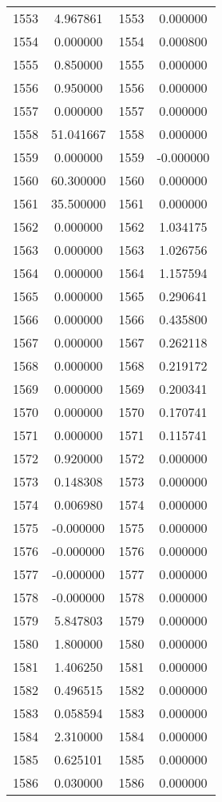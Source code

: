 \documentclass[12pt]{article}
\begin{document}
\begin{longtable}{@{}cccc@{}}
1553 & 4.967861 & 1553 & 0.000000 \\
1554 & 0.000000 & 1554 & 0.000800 \\
1555 & 0.850000 & 1555 & 0.000000 \\
1556 & 0.950000 & 1556 & 0.000000 \\
1557 & 0.000000 & 1557 & 0.000000 \\
1558 & 51.041667 & 1558 & 0.000000 \\
1559 & 0.000000 & 1559 & -0.000000 \\
1560 & 60.300000 & 1560 & 0.000000 \\
1561 & 35.500000 & 1561 & 0.000000 \\
1562 & 0.000000 & 1562 & 1.034175 \\
1563 & 0.000000 & 1563 & 1.026756 \\
1564 & 0.000000 & 1564 & 1.157594 \\
1565 & 0.000000 & 1565 & 0.290641 \\
1566 & 0.000000 & 1566 & 0.435800 \\
1567 & 0.000000 & 1567 & 0.262118 \\
1568 & 0.000000 & 1568 & 0.219172 \\
1569 & 0.000000 & 1569 & 0.200341 \\
1570 & 0.000000 & 1570 & 0.170741 \\
1571 & 0.000000 & 1571 & 0.115741 \\
1572 & 0.920000 & 1572 & 0.000000 \\
1573 & 0.148308 & 1573 & 0.000000 \\
1574 & 0.006980 & 1574 & 0.000000 \\
1575 & -0.000000 & 1575 & 0.000000 \\
1576 & -0.000000 & 1576 & 0.000000 \\
1577 & -0.000000 & 1577 & 0.000000 \\
1578 & -0.000000 & 1578 & 0.000000 \\
1579 & 5.847803 & 1579 & 0.000000 \\
1580 & 1.800000 & 1580 & 0.000000 \\
1581 & 1.406250 & 1581 & 0.000000 \\
1582 & 0.496515 & 1582 & 0.000000 \\
1583 & 0.058594 & 1583 & 0.000000 \\
1584 & 2.310000 & 1584 & 0.000000 \\
1585 & 0.625101 & 1585 & 0.000000 \\
1586 & 0.030000 & 1586 & 0.000000 \\

\end{longtable}
\end{document}
